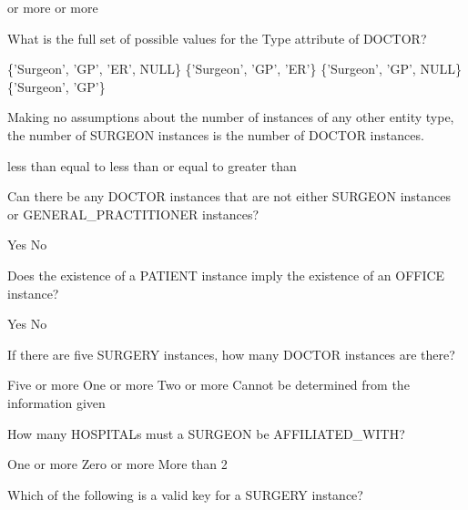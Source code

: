 \documentclass[9pt]{exam}
\begin{document}
\begin{questions}
\begin{choices}
 or more
 or more
\end{choices}

\question[4] What is the full set of possible values for the Type attribute of DOCTOR?

\begin{choices}
  \choice \{'Surgeon', 'GP', 'ER', NULL\}
  \choice \{'Surgeon', 'GP', 'ER'\}
  \choice \{'Surgeon', 'GP', NULL\}
  \correctchoice \{'Surgeon', 'GP'\}
\end{choices}

\question[4] Making no assumptions about the number of instances of any other entity type, the number of SURGEON instances is \makebox[.25in]{\hrulefill} the number of DOCTOR instances.

\begin{choices}
\choice less than
\choice equal to
\correctchoice less than or equal to
\choice greater than
\end{choices}

\question[4] Can there be any DOCTOR instances that are not either SURGEON instances or GENERAL\_PRACTITIONER instances?

\begin{choices}
\choice Yes
\correctchoice No
\end{choices}

\question[4] Does the existence of a PATIENT instance imply the existence of an OFFICE instance?

\begin{choices}
\correctchoice Yes
\choice No
\end{choices}

\newpage

\question[4] If there are five SURGERY instances, how many DOCTOR instances are there?

\begin{choices}
\choice Five or more
\choice One or more
\correctchoice Two or more
\choice Cannot be determined from the information given
\end{choices}

\question[4] How many HOSPITALs must a SURGEON be AFFILIATED\_WITH?

\begin{choices}
\correctchoice One or more
\choice Zero or more
\choice More than 2
\end{choices}

\question[4] Which of the following is a valid key for a SURGERY instance?


\end{questions}
\end{document}
